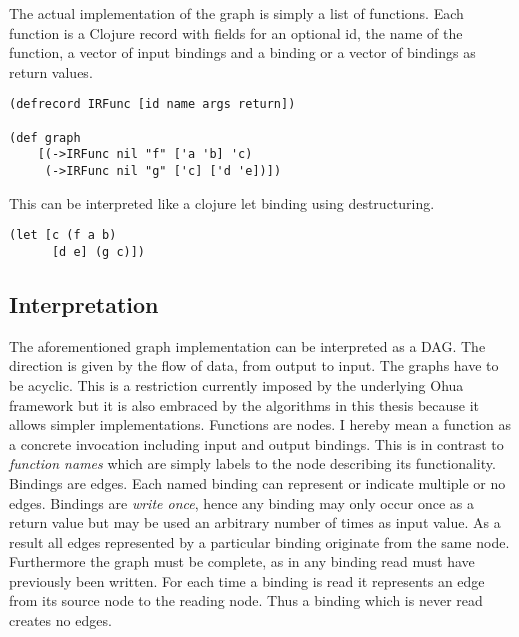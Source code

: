 The actual implementation of the graph is simply a list of functions. Each function is a Clojure record with fields for an optional id, the name of the function, a vector of input bindings and a binding or a vector of bindings as return values.

\begin{verbatim}
(defrecord IRFunc [id name args return])

(def graph
    [(->IRFunc nil "f" ['a 'b] 'c)
     (->IRFunc nil "g" ['c] ['d 'e])])

\end{verbatim}

This can be interpreted like a clojure let binding using destructuring.

\begin{verbatim}
(let [c (f a b)
      [d e] (g c)])
\end{verbatim}

\subsection{Interpretation}

The aforementioned graph implementation can be interpreted as a DAG.
The direction is given by the flow of data, from output to input.
The graphs have to be acyclic.
This is a restriction currently imposed by the underlying Ohua framework but it is also embraced by the algorithms in this thesis because it allows simpler implementations.
Functions are nodes.
I hereby mean a function as a concrete invocation including input and output bindings.
This is in contrast to \textit{function names} which are simply labels to the node describing its functionality.
Bindings are edges.
Each named binding can represent or indicate multiple or no edges.
Bindings are \textit{write once}, hence any binding may only occur once as a return value but may be used an arbitrary number of times as input value.
As a result all edges represented by a particular binding originate from the same node.
Furthermore the graph must be complete, as in any binding read must have previously been written.
For each time a binding is read it represents an edge from its source node to the reading node.
Thus a binding which is never read creates no edges.

